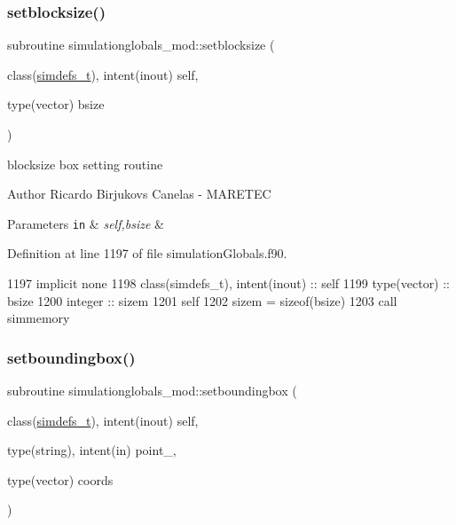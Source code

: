\subsubsection{\texorpdfstring{setblocksize()}{setblocksize()}}
{\footnotesize\ttfamily subroutine simulationglobals\+\_\+mod\+::setblocksize (\begin{DoxyParamCaption}\item[{class(\mbox{\hyperlink{structsimulationglobals__mod_1_1simdefs__t}{simdefs\+\_\+t}}), intent(inout)}]{self,  }\item[{type(vector)}]{bsize }\end{DoxyParamCaption})\hspace{0.3cm}{\ttfamily [private]}}



blocksize box setting routine 

\begin{DoxyAuthor}{Author}
Ricardo Birjukovs Canelas -\/ M\+A\+R\+E\+T\+EC 
\end{DoxyAuthor}

\begin{DoxyParams}[1]{Parameters}
\mbox{\tt in}  & {\em self,bsize} & \\
\hline
\end{DoxyParams}


Definition at line 1197 of file simulation\+Globals.\+f90.


\begin{DoxyCode}
1197     \textcolor{keywordtype}{implicit none}
1198     \textcolor{keywordtype}{class}(simdefs\_t), \textcolor{keywordtype}{intent(inout)} :: self
1199     \textcolor{keywordtype}{type}(vector) :: bsize
1200     \textcolor{keywordtype}{integer} :: sizem
1201     self%
1202     sizem = sizeof(bsize)
1203     \textcolor{keyword}{call }simmemory%
\end{DoxyCode}
\mbox{\label{namespacesimulationglobals__mod_abf5afcc12763caab3a5fc394255ced44}} 
\subsubsection{\texorpdfstring{setboundingbox()}{setboundingbox()}}
{\footnotesize\ttfamily subroutine simulationglobals\+\_\+mod\+::setboundingbox (\begin{DoxyParamCaption}\item[{class(\mbox{\hyperlink{structsimulationglobals__mod_1_1simdefs__t}{simdefs\+\_\+t}}), intent(inout)}]{self,  }\item[{type(string), intent(in)}]{point\+\_\+,  }\item[{type(vector)}]{coords }\end{DoxyParamCaption})\hspace{0.3cm}{\ttfamily [private]}}



